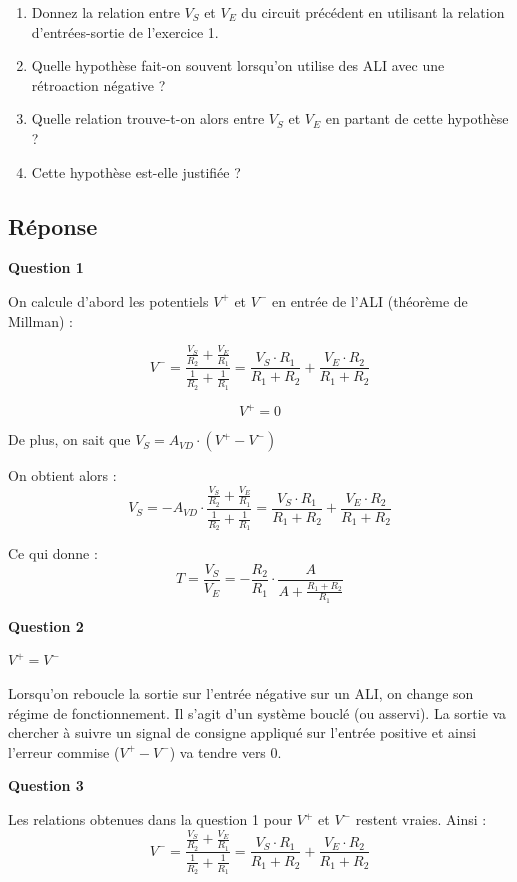 \begin{enumerate}
	\item Donnez la relation entre $V_S$ et $V_E$ du circuit précédent en utilisant la relation d'entrées-sortie de l'exercice 1.
	\item Quelle hypothèse fait-on souvent lorsqu'on utilise des ALI avec une rétroaction négative ?
	\item Quelle relation trouve-t-on alors entre $V_S$ et $V_E$ en partant de cette hypothèse ?
	\item Cette hypothèse est-elle justifiée ?
\end{enumerate}


\subsection*{Réponse}

\textbf{Question 1}

On calcule d'abord les potentiels $V^+$ et $V^-$ en entrée de l'ALI (théorème de Millman) :

$$V^- = \frac{\frac{V_S}{R_2} + \frac{V_E}{R_1}}{\frac{1}{R_2} + \frac{1}{R_1}} = \frac{V_S \cdot R_1}{R_1 + R_2} + \frac{V_E \cdot R_2}{R_1 + R_2}$$

$$V^+ = 0$$

De plus, on sait que $V_S = A_{VD} \cdot (V^+ - V^-)$

On obtient alors : $$V_S = - A_{VD} \cdot \frac{\frac{V_S}{R_2} + \frac{V_E}{R_1}}{\frac{1}{R_2} + \frac{1}{R_1}} = \frac{V_S \cdot R_1}{R_1 + R_2} + \frac{V_E \cdot R_2}{R_1 + R_2}$$

Ce qui donne : $$T = \frac{V_S}{V_E} = - \frac{R_2}{R_1} \cdot \frac{A}{A + \frac{R_1 + R_2}{R_1}}$$


\textbf{Question 2}

$V^+ = V^-$

Lorsqu'on reboucle la sortie sur l'entrée négative sur un ALI, on change son régime de fonctionnement. Il s'agit d'un système bouclé (ou asservi). La sortie va chercher à suivre un signal de consigne appliqué sur l'entrée positive et ainsi l'erreur commise ($V^+ - V^-$) va tendre vers 0.


\textbf{Question 3}

Les relations obtenues dans la question 1 pour $V^+$ et $V^-$ restent vraies. Ainsi : 
$$V^- = \frac{\frac{V_S}{R_2} + \frac{V_E}{R_1}}{\frac{1}{R_2} + \frac{1}{R_1}} = \frac{V_S \cdot R_1}{R_1 + R_2} + \frac{V_E \cdot R_2}{R_1 + R_2}$$

